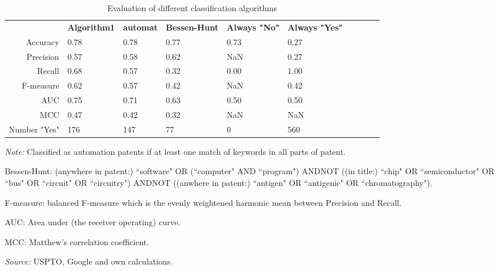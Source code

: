 \begin{table}
\begin{small}
\begin{threeparttable}
\caption{{\normalsize Evaluation of different classification algorithms}}
\label{table:table_compare_classalg}
\begin{tabular}{rlllllllll}
\toprule 
 & \textbf{Algorithm1} & \textbf{automat} & \textbf{Bessen-Hunt} & \textbf{Always "No"} & \textbf{Always "Yes"}  \tabularnewline 
Accuracy & 0.78 & 0.78 & 0.77 & 0.73 & 0.27 & & & &  \tabularnewline 
Precision & 0.57 & 0.58 & 0.62 & NaN & 0.27 & & & &  \tabularnewline 
Recall & 0.68 & 0.57 & 0.32 & 0.00 & 1.00 & & & &  \tabularnewline 
F-measure & 0.62 & 0.57 & 0.42 & NaN & 0.42 & & & &  \tabularnewline 
AUC & 0.75 & 0.71 & 0.63 & 0.50 & 0.50 & & & &  \tabularnewline 
MCC & 0.47 & 0.42 & 0.32 & NaN & NaN & & & &  \tabularnewline 
Number "Yes" & 176 & 147 & 77 & 0 & 560 & & & &  \tabularnewline 
\bottomrule 
\end{tabular} 
\begin{tablenotes}
\small
\item\textit{Note:} Classified as automation patents if at least one match of keywords in all parts of patent. \item Bessen-Hunt: (anywhere in patent:) ``software" OR (``computer" AND ``program") ANDNOT ((in title:) ``chip" OR ``semiconductor" OR ``bus" OR ``circuit" OR ``circuitry") ANDNOT ((anwhere in patent:) ``antigen" OR ``antigenic" OR ``chromatography").
\item F-measure: balanced F-measure which is the evenly weightened harmonic mean between Precision and Recall. 
\item AUC: Area under (the receiver operating) curve.
\item MCC: Matthew's correlation coefficient.
\item\textit{Source:} USPTO, Google and own calculations.
\end{tablenotes}
\end{threeparttable}
\end{small}
\end{table}
